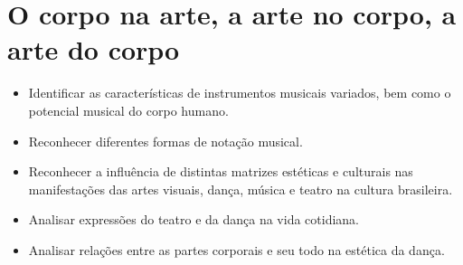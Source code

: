 \chapter{O corpo na arte, a arte no corpo, a arte do corpo}



\begin{itemize}
\item Identificar as características de instrumentos musicais variados, bem
como o potencial musical do corpo humano.

\item Reconhecer diferentes formas de notação musical.

\item Reconhecer a influência de distintas matrizes estéticas e culturais
nas manifestações das artes visuais, dança, música e teatro na cultura
brasileira.

\item Analisar expressões do teatro e da dança na vida cotidiana.

\item Analisar relações entre as partes corporais e seu todo na estética da dança.
\end{itemize}

